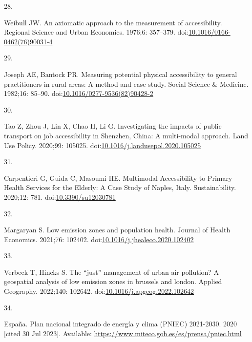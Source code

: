 \documentclass[10pt,letterpaper]{article}
\newlength{\cslhangindent}
\newlength{\csllabelwidth}
\newlength{\cslentryspacingunit} %
\newenvironment{CSLReferences}[2] %
 {%
  \setlength{\parindent}{0pt}
  \ifodd #1
  \let\oldpar\par
  \def\par{\hangindent=\cslhangindent\oldpar}
  \fi
  \setlength{\parskip}{#2\cslentryspacingunit}
 }%
 {}
\newcommand{\CSLLeftMargin}[1]{\parbox[t]{\csllabelwidth}{#1}}
\newcommand{\CSLRightInline}[1]{\parbox[t]{\linewidth - \csllabelwidth}{#1}\break}
\begin{document}
\begin{CSLReferences}{0}{0}
\leavevmode{}%
\CSLLeftMargin{28. }%
\CSLRightInline{Weibull JW. An axiomatic approach to the measurement of
accessibility. Regional Science and Urban Economics. 1976;6: 357--379.
doi:\href{https://doi.org/10.1016/0166-0462(76)90031-4}{10.1016/0166-0462(76)90031-4}}

\leavevmode{}%
\CSLLeftMargin{29. }%
\CSLRightInline{Joseph AE, Bantock PR. Measuring potential physical
accessibility to general practitioners in rural areas: A method and case
study. Social Science \& Medicine. 1982;16: 85--90.
doi:\href{https://doi.org/10.1016/0277-9536(82)90428-2}{10.1016/0277-9536(82)90428-2}}

\leavevmode{}%
\CSLLeftMargin{30. }%
\CSLRightInline{Tao Z, Zhou J, Lin X, Chao H, Li G. Investigating the
impacts of public transport on job accessibility in {Shenzhen}, {China}:
A multi-modal approach. Land Use Policy. 2020;99: 105025.
doi:\href{https://doi.org/10.1016/j.landusepol.2020.105025}{10.1016/j.landusepol.2020.105025}}

\leavevmode{}%
\CSLLeftMargin{31. }%
\CSLRightInline{Carpentieri G, Guida C, Masoumi HE. Multimodal
{Accessibility} to {Primary Health Services} for the {Elderly}: {A Case
Study} of {Naples}, {Italy}. Sustainability. 2020;12: 781.
doi:\href{https://doi.org/10.3390/su12030781}{10.3390/su12030781}}

\leavevmode{}%
\CSLLeftMargin{32. }%
\CSLRightInline{Margaryan S. Low emission zones and population health.
Journal of Health Economics. 2021;76: 102402.
doi:\href{https://doi.org/10.1016/j.jhealeco.2020.102402}{10.1016/j.jhealeco.2020.102402}}

\leavevmode{}%
\CSLLeftMargin{33. }%
\CSLRightInline{Verbeek T, Hincks S. The {``just''} management of urban
air pollution? A geospatial analysis of low emission zones in brussels
and london. Applied Geography. 2022;140: 102642.
doi:\href{https://doi.org/10.1016/j.apgeog.2022.102642}{10.1016/j.apgeog.2022.102642}}

\leavevmode{}%
\CSLLeftMargin{34. }%
\CSLRightInline{España. Plan nacional integrado de energía y clima
({PNIEC}) 2021-2030. 2020 {[}cited 30 Jul 2023{]}. Available:
\url{https://www.miteco.gob.es/es/prensa/pniec.html}}


\end{CSLReferences}
\end{document}
